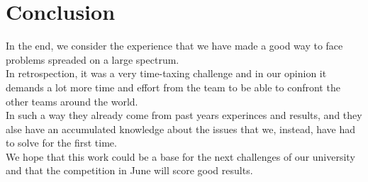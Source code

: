 \documentclass[oneside,onecolumn]{article}
\begin{document}
\bigskip
\bigskip
\bigskip
\bigskip
\bigskip
\bigskip
\bigskip
\bigskip
\bigskip
\bigskip
\bigskip
\bigskip
\bigskip
\bigskip
\bigskip



\section{Conclusion}
In the end, we consider the experience that we have made a good way to face
problems spreaded on a large spectrum.\\
In retrospection, it was a very time-taxing challenge and in our opinion it
demands a lot more time and effort from the team to be able to confront the
other teams around the world.\\
In such a way they already  come from past years experinces and results,
and they alse have an accumulated knowledge about the issues that we, instead, have had to
solve for the first time.\\
We hope that this work could be a base for the next challenges of our university
and that the competition in June will score good results.
\end{document}

